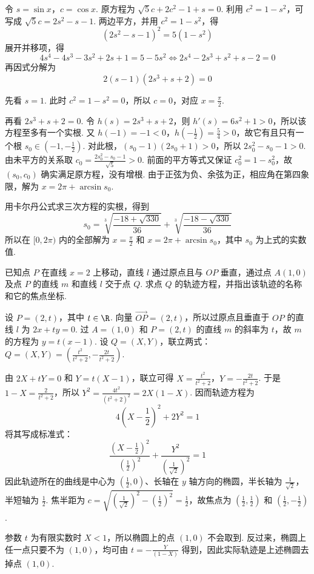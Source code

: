 \documentclass[UTF8,a4paper,oneside,11pt]{ctexbook}
\begin{document}
\begin{solution}
令 \(s=\sin x\)，\(c=\cos x\). 原方程为 \( \sqrt5c+2c^2-1+s=0\). 利用 \(c^2=1-s^2\)，可写成
\(\sqrt5c=2s^2-s-1\). 两边平方，并用 \(c^2=1-s^2\)，得
\[
\left(2s^2-s-1\right)^2=5\left(1-s^2\right)
\]
展开并移项，得
\[
4s^4-4s^3-3s^2+2s+1=5-5s^2
\Longleftrightarrow 2s^4-2s^3+s^2+s-2=0
\]
再因式分解为
\[
2(s-1)\left(2s^3+s+2\right)=0
\]

先看 \(s=1\). 此时 \(c^2=1-s^2=0\)，所以 \(c=0\)，对应 \(x=\frac\pi2\).

再看 \(2s^3+s+2=0\). 令 \(h(s)=2s^3+s+2\)，则 \(h'(s)=6s^2+1>0\)，所以该方程至多有一个实根. 又 \(h(-1)=-1<0\)，\(h(-\frac12)=\frac54>0\)，故它有且只有一个根 \(s_0\in(-1,-\frac12)\). 对此根，\((s_0-1)(2s_0+1)>0\)，所以 \(2s_0^2-s_0-1>0\). 由未平方的关系取
\(c_0=\frac{2s_0^2-s_0-1}{\sqrt5}>0\). 前面的平方等式又保证 \(c_0^2=1-s_0^2\)，故 \((s_0,c_0)\) 确实满足原方程，没有增根. 由于正弦为负、余弦为正，相应角在第四象限，解为 \(x=2\pi+\arcsin s_0\).

用卡尔丹公式求三次方程的实根，得到
\[
s_0=\sqrt[3]{\frac{-18+\sqrt{330}}{36}}+\sqrt[3]{\frac{-18-\sqrt{330}}{36}}
\]
所以在 \([0,2\pi)\) 内的全部解为 \(x=\frac\pi2\) 和 \(x=2\pi+\arcsin s_0\)，其中 \(s_0\) 为上式的实数值.
\end{solution}

\begin{problem}
已知点 \(P\) 在直线 \(x=2\) 上移动，直线 \(l\) 通过原点且与 \(OP\) 垂直，通过点 \(A(1,0)\) 及点 \(P\) 的直线 \(m\) 和直线 \(l\) 交于点 \(Q\). 求点 \(Q\) 的轨迹方程，并指出该轨迹的名称和它的焦点坐标.
\end{problem}

\begin{solution}
设 \(P=(2,t)\)，其中 \(t\in\R\). 向量 \(\overrightarrow{OP}=(2,t)\)，所以过原点且垂直于 \(OP\) 的直线 \(l\) 为 \(2x+ty=0\). 过 \(A=(1,0)\) 和 \(P=(2,t)\) 的直线 \(m\) 的斜率为 \(t\)，故 \(m\) 的方程为 \(y=t(x-1)\). 设 \(Q=(X,Y)\)，联立两式：
\(Q=(X,Y)=\left(\frac{t^2}{t^2+2},-\frac{2t}{t^2+2}\right)\).

由 \(2X+tY=0\) 和 \(Y=t(X-1)\)，联立可得 \(X=\frac{t^2}{t^2+2}\)，\(Y=-\frac{2t}{t^2+2}\).
于是 \(1-X=\frac2{t^2+2}\)，所以
\(Y^2=\frac{4t^2}{(t^2+2)^2}=2X(1-X)\). 因而轨迹方程为
\[
4\left(X-\frac12\right)^2+2Y^2=1
\]
将其写成标准式：
\[
\frac{\left(X-\frac12\right)^2}{\left(\frac12\right)^2}
+\frac{Y^2}{\left(\frac1{\sqrt2}\right)^2}=1
\]
因此轨迹所在的曲线是中心为 \(\left(\frac12,0\right)\)、长轴在 \(y\) 轴方向的椭圆，半长轴为 \(\frac1{\sqrt2}\)，半短轴为 \(\frac12\). 焦半距为
\(c=\sqrt{\left(\frac1{\sqrt2}\right)^2-\left(\frac12\right)^2}=\frac12\)，故焦点为 \(\left(\frac12,\frac12\right)\) 和 \(\left(\frac12,-\frac12\right)\).

参数 \(t\) 为有限实数时 \(X<1\)，所以椭圆上的点 \((1,0)\) 不会取到. 反过来，椭圆上任一点只要不为 \((1,0)\)，均可由 \(t=-\frac{Y}{(1-X)}\) 得到，因此实际轨迹是上述椭圆去掉点 \((1,0)\).
\end{solution}
\end{document}
